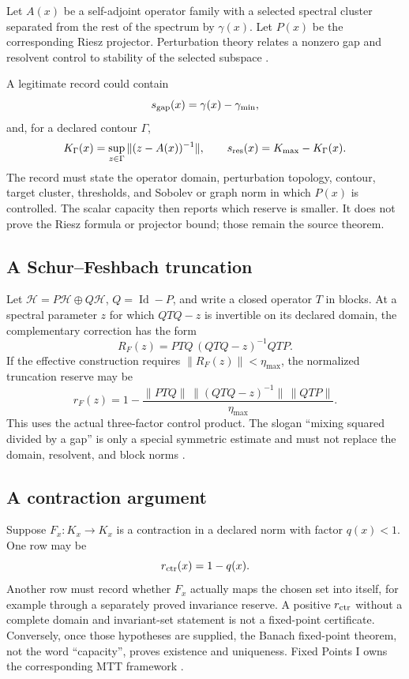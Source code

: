 \documentclass[11pt]{article}
\theoremstyle{definition}
\theoremstyle{remark}
\newcommand{\cH}{\mathcal H}
\newcommand{\Id}{\operatorname{Id}}
\begin{document}
Let \(A(x)\) be a self-adjoint operator family with a selected spectral
cluster separated from the rest of the spectrum by \(\gamma(x)\).
Let \(P(x)\) be the corresponding Riesz projector.  Perturbation theory
relates a nonzero gap and resolvent control to stability of the selected
subspace \cite{Kato1966,DavisKahan1970}.

A legitimate record could contain
\[
 s_{\rm gap}(x)=\gamma(x)-\gamma_{\min},
\]
and, for a declared contour \(\Gamma\),
\[
 K_\Gamma(x)
 =
 \sup_{z\in\Gamma}\|(z-A(x))^{-1}\|,
 \qquad
 s_{\rm res}(x)=K_{\max}-K_\Gamma(x).
\]
The record must state the operator domain, perturbation topology, contour,
target cluster, thresholds, and Sobolev or graph norm in which \(P(x)\) is
controlled.  The scalar capacity then reports which reserve is smaller.
It does not prove the Riesz formula or projector bound; those remain the
source theorem.

\subsection{A Schur--Feshbach truncation}

Let \(\cH=P\cH\oplus Q\cH\), \(Q=\Id-P\), and write a closed operator \(T\)
in blocks.  At a spectral parameter \(z\) for which \(QTQ-z\) is invertible
on its declared domain, the complementary correction has the form
\[
 R_F(z)
 =
 PTQ\,(QTQ-z)^{-1}QTP.
\]
If the effective construction requires
\(\|R_F(z)\|<\eta_{\max}\), the normalized truncation reserve may be
\[
 r_F(z)
 =
 1-
 \frac{
 \|PTQ\|\,
 \|(QTQ-z)^{-1}\|\,
 \|QTP\|
 }{\eta_{\max}}.
\]
This uses the actual three-factor control product.  The slogan
``mixing squared divided by a gap'' is only a special symmetric estimate
and must not replace the domain, resolvent, and block norms
\cite{BachEtAl2003}.

\subsection{A contraction argument}

Suppose \(F_x:K_x\to K_x\) is a contraction in a declared norm with factor
\(q(x)<1\).  One row may be
\[
 r_{\rm ctr}(x)=1-q(x).
\]
Another row must record whether \(F_x\) actually maps the chosen set into
itself, for example through a separately proved invariance reserve.  A
positive \(r_{\rm ctr}\) without a complete domain and invariant-set
statement is not a fixed-point certificate.  Conversely, once those
hypotheses are supplied, the Banach fixed-point theorem, not the word
``capacity'', proves existence and uniqueness.  Fixed Points I owns the
corresponding MTT framework \cite{FixedPointsI2026}.
\end{document}
